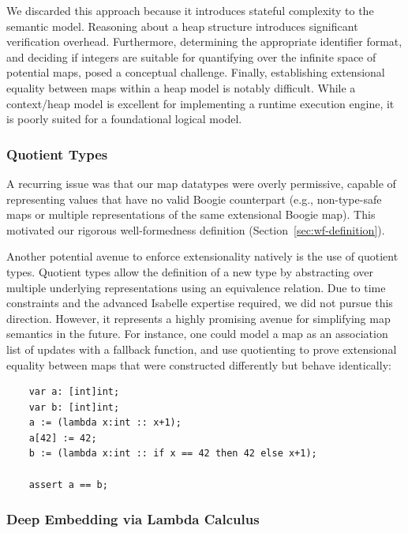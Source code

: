 \documentclass[11pt]{article}
\begin{document}
We discarded this approach because it introduces stateful complexity to the semantic model.
Reasoning about a heap structure introduces significant verification overhead.
Furthermore, determining the appropriate identifier format, and deciding if integers are suitable for quantifying over the infinite space of potential maps, posed a conceptual challenge.
Finally, establishing extensional equality between maps within a heap model is notably difficult.
While a context/heap model is excellent for implementing a runtime execution engine, it is poorly suited for a foundational logical model.

\subsubsection{Quotient Types}

A recurring issue was that our map datatypes were overly permissive, capable of representing values that have no valid Boogie counterpart
(e.g., non-type-safe maps or multiple representations of the same extensional Boogie map).
This motivated our rigorous well-formedness definition (Section~\ref{sec:wf-definition}).

Another potential avenue to enforce extensionality natively is the use of quotient types. \cite{huffman2013lifting}
Quotient types allow the definition of a new type by abstracting over multiple underlying representations using an equivalence relation.
Due to time constraints and the advanced Isabelle expertise required, we did not pursue this direction.
However, it represents a highly promising avenue for simplifying map semantics in the future.
For instance, one could model a map as an association list of updates with a fallback function,
and use quotienting to prove extensional equality between maps that were constructed differently but behave identically:

\begin{verbatim}
    var a: [int]int;
    var b: [int]int;
    a := (lambda x:int :: x+1);
    a[42] := 42;
    b := (lambda x:int :: if x == 42 then 42 else x+1);

    assert a == b;
\end{verbatim}

\subsubsection{Deep Embedding via Lambda Calculus}
\end{document}
